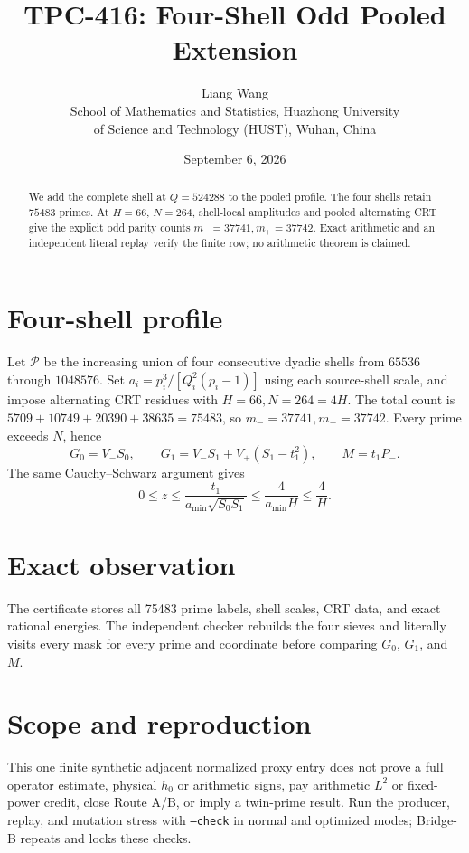 \documentclass[11pt]{article}
\title{TPC-416: Four-Shell Odd Pooled Extension}
\author{Liang Wang\\School of Mathematics and Statistics, Huazhong University\\of Science and Technology (HUST), Wuhan, China}
\date{September 6, 2026}
\begin{document}
\maketitle
\begin{abstract}
We add the complete shell at $Q=524288$ to the pooled profile.  The four
shells retain $75483$ primes.  At $H=66$, $N=264$, shell-local amplitudes and
pooled alternating CRT give the explicit odd parity counts
$m_-=37741,m_+=37742$.  Exact arithmetic and an independent literal replay
verify the finite row; no arithmetic theorem is claimed.
\end{abstract}
\section{Four-shell profile}
Let $\mathcal P$ be the increasing union of four consecutive dyadic shells
from $65536$ through $1048576$.  Set
$a_i=p_i^3/[Q_i^2(p_i-1)]$ using each source-shell scale, and impose alternating
CRT residues with $H=66,N=264=4H$.  The total count is
$5709+10749+20390+38635=75483$, so
$m_-=37741,m_+=37742$.  Every prime exceeds $N$, hence
\[
G_0=V_-S_0,\qquad G_1=V_-S_1+V_+(S_1-t_1^2),\qquad M=t_1P_-.
\]
The same Cauchy--Schwarz argument gives
\[
0\le z\le\frac{t_1}{a_{\min}\sqrt{S_0S_1}}\le\frac4{a_{\min}H}\le\frac4H.\tag{1}
\]
\section{Exact observation}
The certificate stores all 75483 prime labels, shell scales, CRT data, and
exact rational energies.  The independent checker rebuilds the four sieves
and literally visits every mask for every prime and coordinate before comparing
$G_0$, $G_1$, and $M$.
\section{Scope and reproduction}
This one finite synthetic adjacent normalized proxy entry does not prove a full
operator estimate, physical $h_0$ or arithmetic signs, pay arithmetic $L^2$ or
fixed-power credit, close Route A/B, or imply a twin-prime result.  Run the
producer, replay, and mutation stress with \texttt{--check} in normal and
optimized modes; Bridge-B repeats and locks these checks.
\end{document}
